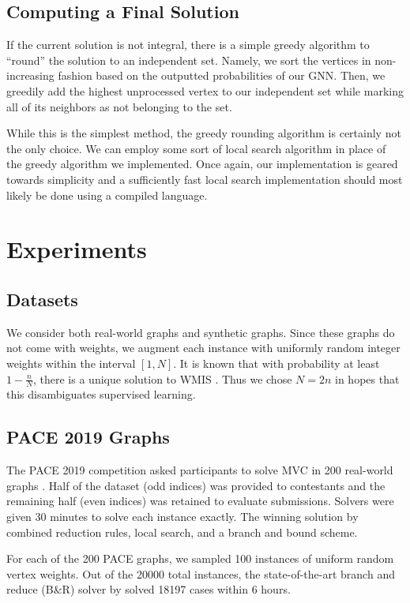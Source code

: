 \documentclass{article}
\begin{document}
\subsection{Computing a Final Solution}
If the current solution is not integral,
there is a simple greedy algorithm to ``round'' the solution to an independent set.
Namely, we sort the vertices in non-increasing fashion based on the outputted probabilities of our GNN.
Then, we greedily add the highest unprocessed vertex to our independent set
while marking all of its neighbors as not belonging to the set.

While this is the simplest method,
the greedy rounding algorithm is certainly not the only choice.
We can employ some sort of local search algorithm \citet{dahlum2016accelerating, chang2017computing} in place of the greedy algorithm we implemented.
Once again,
our implementation is geared towards simplicity
and a sufficiently fast local search implementation
should most likely be done using a compiled language.

\section{Experiments}
\subsection{Datasets}
We consider both real-world graphs and synthetic graphs.
Since these graphs do not come with weights,
we augment each instance with uniformly random integer weights within the interval $[1, N]$.
It is known that with probability at least $1-\frac nN$,
there is a unique solution to WMIS \citet{isolation}.
Thus we chose $N = 2n$ in hopes that this disambiguates supervised learning.

\subsection{PACE 2019 Graphs}
The PACE 2019 competition asked participants to solve MVC in 200 real-world graphs \citet{pace2019}.
Half of the dataset (odd indices) was provided to contestants
and the remaining half (even indices) was retained to evaluate submissions.
Solvers were given 30 minutes to solve each instance exactly.
The winning solution by \citet{wegotyoucovered} combined reduction rules,
local search, and a branch and bound scheme.

For each of the 200 PACE graphs,
we sampled 100 instances of uniform random vertex weights.
Out of the 20000 total instances,  
the state-of-the-art branch and reduce (B\&R) solver by \citet{kamis} solved 18197 cases within 6 hours.
\end{document}
